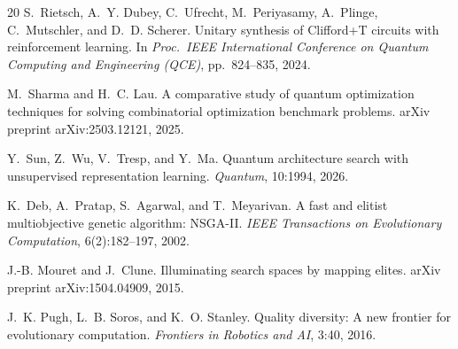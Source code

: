 \documentclass[twocolumn,11pt]{article}
\begin{document}
\begin{thebibliography}{20}
S.~Rietsch, A.~Y. Dubey, C.~Ufrecht, M.~Periyasamy, A.~Plinge,
  C.~Mutschler, and D.~D. Scherer.
\newblock Unitary synthesis of {C}lifford+{T} circuits with reinforcement
  learning.
\newblock In \emph{Proc.\ IEEE International Conference on Quantum Computing
  and Engineering (QCE)}, pp.~824--835, 2024.

M.~Sharma and H.~C. Lau.
\newblock A comparative study of quantum optimization techniques for solving
  combinatorial optimization benchmark problems.
\newblock arXiv preprint arXiv:2503.12121, 2025.

Y.~Sun, Z.~Wu, V.~Tresp, and Y.~Ma.
\newblock Quantum architecture search with unsupervised representation learning.
\newblock \emph{Quantum}, 10:1994, 2026.

K.~Deb, A.~Pratap, S.~Agarwal, and T.~Meyarivan.
\newblock A fast and elitist multiobjective genetic algorithm: {NSGA-II}.
\newblock \emph{IEEE Transactions on Evolutionary Computation}, 6(2):182--197,
  2002.

J.-B. Mouret and J.~Clune.
\newblock Illuminating search spaces by mapping elites.
\newblock arXiv preprint arXiv:1504.04909, 2015.

J.~K. Pugh, L.~B. Soros, and K.~O. Stanley.
\newblock Quality diversity: A new frontier for evolutionary computation.
\newblock \emph{Frontiers in Robotics and AI}, 3:40, 2016.

\end{thebibliography}
\end{document}
